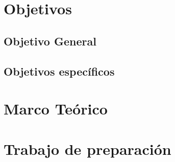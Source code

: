 \documentclass{article}
\begin{document}

\tableofcontents
\newpage

\section{Objetivos}

\subsection{Objetivo General}



\subsection{Objetivos específicos}




\section{Marco Teórico}



\section{Trabajo de preparación}



\FloatBarrier

\end{document}
